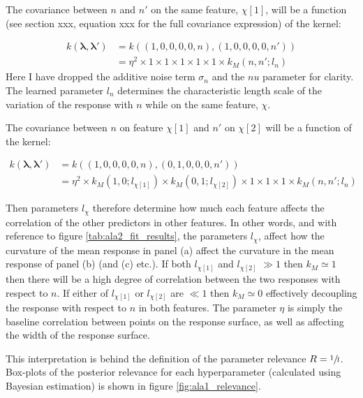 The covariance between $n$ and $n'$ on the same feature, $\chi[1]$, will be a function (see section xxx, equation xxx for the full covariance expression) of the kernel:

\begin{equation}
\begin{split}
    k(\mathbf{\lambda}, \mathbf{\lambda}')& = k\left((1, 0, 0, 0, 0, n), (1, 0, 0, 0, 0, n')\right) \\
    & = \eta^{2}\times 1 \times 1\times 1 \times 1\times 1 \times k_{M}(n, n'; l_{n})
\end{split}
\end{equation}
Here I have dropped the additive noise term $\sigma_{n}$ and the $nu$ parameter for clarity. The learned parameter $l_{n}$ determines the characteristic length scale of the variation of the response with $n$ while on the same feature, $\chi$.

The covariance between $n$ on feature $\chi[1]$ and $n'$ on $\chi[2]$ will be a function of the kernel:

\begin{equation}
\begin{split}
    k(\mathbf{\lambda}, \mathbf{\lambda}')& = k\left((1, 0, 0, 0, 0, n), (0, 1, 0, 0, 0, n')\right) \\
    & = \eta^{2}\times k_{M}\left(1, 0; l_{\chi[1]}\right) \times k_{M}\left(0, 1; l_{\chi[2]}\right) \times 1 \times 1\times 1 \times k_{M}(n, n'; l_{n})
\end{split}
\end{equation}

Then  parameters $l_{\chi}$ therefore determine how much each feature affects the correlation of the other predictors in other features. In other words, and with reference to figure \ref{tab:ala2_fit_results}, the parameters $l_{\chi}$, affect how  the curvature of the mean response in panel (a) affect the curvature in the mean response of panel (b) (and (c) etc.). If both $l_{\chi[1]}$ and $l_{\chi[2]}$ $\gg 1$ then $k_{M} \simeq 1$ then there will be a high degree of correlation between the two responses with respect to $n$. If either of $l_{\chi[1]}$ or $l_{\chi[2]}$ are $\ll 1$ then $k_{M} \simeq 0$ effectively decoupling the response with respect to $n$ in both features. The parameter $\eta$ is simply the baseline correlation between points on the response surface, as well as affecting the width of the response surface.  

This interpretation is behind the definition of the parameter relevance $R = \sfrac{1}{l}$. Box-plots of the posterior relevance for each hyperparameter (calculated using Bayesian estimation) is shown in figure \ref{fig:ala1_relevance}.   


